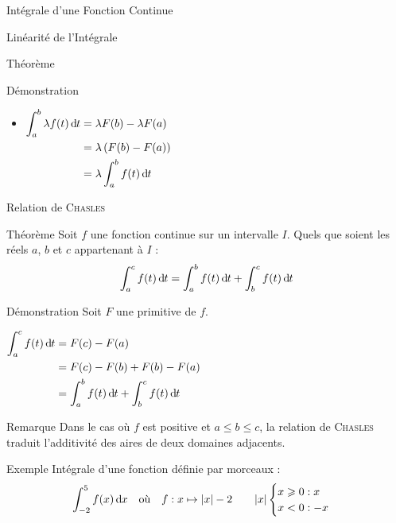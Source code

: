 \documentclass{coursbook}
\begin{document}
\begin{Gpartie}{Intégrale d'une Fonction Continue}
\begin{Spartie}{Linéarité de l'Intégrale}
\begin{SSpartie}{Théorème}
\begin{SSSpartie}{Démonstration}
\begin{itemize}
                        $\begin{aligned}[t]
                            \int_a^b\left(f+g\right)(t)\dt&=\left(F+G\right)(t)-\left(F+G\right)(t) \\
                            &=F(b)+G(b)-F(a)-G(a) \\
                            &=F(b)-F(a)+G(b)-G(a) \\
                            &=\int_a^b f(t)\dt+\int_a^b g(t)\dt
                        \end{aligned}$

                        \item $\begin{aligned}[t]
                            \int_a^b\lambda f(t)\,\mathrm{d}\hspace*{-0.05em}t&=\lambda F(b)-\lambda F(a) \\
                            &=\lambda\left(F(b)-F(a)\right) \\
                            &=\lambda\int_a^b f(t)\,\mathrm{d}\hspace*{-0.05em}t
                        \end{aligned}$
                    \end{itemize}
                \end{SSSpartie}
            \end{SSpartie}
        \end{Spartie}
        \begin{Spartie}{Relation de \textsc{Chasles}} 
            \begin{SSpartie}{Théorème} 
                Soit $f$ une fonction continue sur un intervalle $I$. Quels que soient les réels $a$, $b$ et $c$ appartenant à $I$ : \[\int_a^c f(t)\,\mathrm{d}\hspace*{-0.05em}t=\int_a^b f(t)\,\mathrm{d}\hspace*{-0.05em}t+\int_b^cf(t)\,\mathrm{d}\hspace*{-0.05em}t\]
                \begin{SSSpartie}{Démonstration} 
                    Soit $F$ une primitive de $f$.

                    $\begin{aligned}[t]
                        \int_a^c f(t)\,\mathrm{d}\hspace*{-0.05em}t&=F(c)-F(a) \\
                        &=F(c)-F(b)+F(b)-F(a) \\
                        &=\int_a^b f(t)\,\mathrm{d}\hspace*{-0.05em}t+\int_b^c f(t)\,\mathrm{d}\hspace*{-0.05em}t
                    \end{aligned}$
                \end{SSSpartie}
            \end{SSpartie}
            \begin{SSpartie}{Remarque} 
                Dans le cas où $f$ est positive et $a\leq b\leq c$, la relation de \textsc{Chasles} traduit l'additivité des aires de deux domaines adjacents.
            \end{SSpartie}
            \begin{SSpartie}{Exemple} 
                Intégrale d'une fonction définie par morceaux : \[\int_{-2}^5f(x)\,\mathrm{d}\hspace*{-0.05em}x\quad\text{où}\quad f:x\mapsto\lvert x\rvert-2\qquad\lvert x\rvert\begin{cases}x\geqslant0:x\\x<0:-x\end{cases}\]


\end{SSpartie}
\end{Spartie}
\end{Gpartie}
\end{document}
